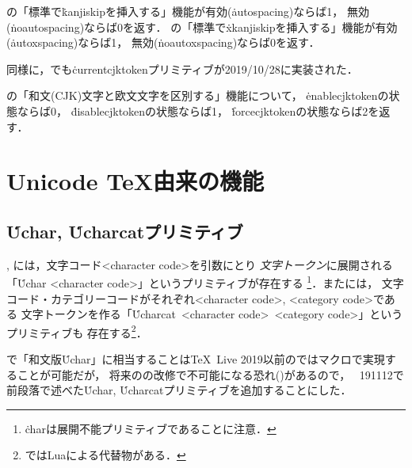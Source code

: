 \documentclass[a4paper,11pt,nomag,dvipdfmx]{jsarticle}
\begin{document}
\begin{cslist}
  \pTeX の「標準で\.{kanjiskip}を挿入する」機能が有効(\.{autospacing})ならば1，
  無効(\.{noautospacing})ならば0を返す．
  \pTeX の「標準で\.{xkanjiskip}を挿入する」機能が有効(\.{autoxspacing})ならば1，
  無効(\.{noautoxspacing})ならば0を返す．
\end{cslist}

同様に，\eupTeX でも\.{currentcjktoken}プリミティブが2019/10/28に実装された．

\begin{cslist}
  \upTeX の「和文(CJK)文字と欧文文字を区別する」機能について，
  \.{enablecjktoken}の状態ならば0，
  \.{disablecjktoken}の状態ならば1，
  \.{forcecjktoken}の状態ならば2を返す．
\end{cslist}


\section{Unicode \TeX 由来の機能}

\subsection{\.{Uchar}, \.{Ucharcat}プリミティブ}
, には，文字コード<character code>を引数にとり
\emph{文字トークン}に展開される「\.{Uchar} <character code>」というプリミティブが存在する
\footnote{\.{char}は展開不能プリミティブであることに注意．}．またには，
文字コード・カテゴリーコードがそれぞれ<character code>, <category code>である
文字トークンを作る「\.{Ucharcat}~<character code>~<category code>」というプリミティブも
存在する\footnote{ではLuaによる代替物がある．}．

\pTeX で「和文版\.{Uchar}」に相当することは\TeX~Live 2019以前の\pTeX ではマクロで実現することが可能だが，
将来の\pTeX の改修で不可能になる恐れ(\cite{tjb81,tjb95})があるので，
\epTeX~191112で前段落で述べた\.{Uchar}, \.{Ucharcat}プリミティブを追加することにした．
\end{document}
